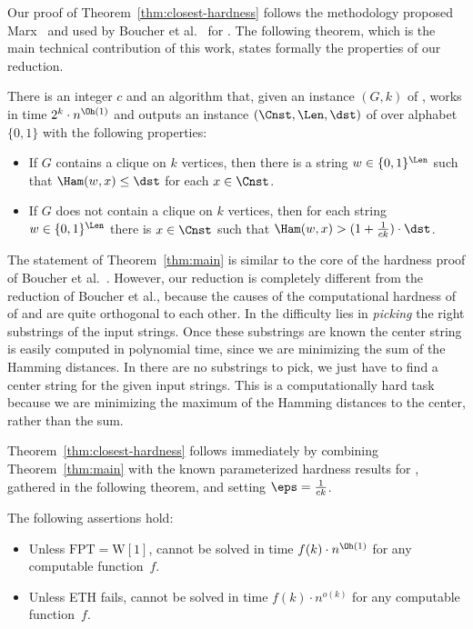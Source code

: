 Our proof of Theorem~\ref{thm:closest-hardness} follows the methodology proposed Marx~\cite{Marx08-survey} and used by Boucher et al.~\cite{Boucher15} for \cPattern. 
The following theorem, which is the main technical contribution of this work, states formally the properties of our reduction.

\begin{theorem}\label{thm:main}
There is an integer $c$ and an algorithm that, given an instance $(G,k)$ of \clique, works in time $2^k\cdot n^{\Oh(1)}$ and outputs an instance $(\Cnst,\Len,\dst)$ of \clString over alphabet $\{0,1\}$ with the following properties:
\begin{itemize}
\item If $G$ contains a clique on $k$ vertices, then there is a string $w\in \{0,1\}^\Len$ such that $\Ham(w,x)\leq \dst$ for each $x\in \Cnst$.
\item If $G$ does not contain a clique on $k$ vertices, then for each string $w\in \{0,1\}^\Len$ there is $x\in \Cnst$ such that $\Ham(w,x)>(1+\frac{1}{ck})\cdot \dst$. 
\end{itemize}
\end{theorem}

The statement of Theorem~\ref{thm:main} is similar to the core of the hardness proof of Boucher et al.~\cite{Boucher15}. However, our reduction is completely different from the reduction of Boucher et al., because the causes of the computational hardness of of \clString and \cPattern are quite orthogonal to each other. In \cPattern the difficulty lies in {\em picking} the right substrings of the input strings. Once these substrings are known the center string is easily computed in polynomial time, since we are minimizing the sum of the Hamming distances. In \clString there are no substrings to pick, we just have to find a center string for the given input strings. This is a computationally hard task because we are minimizing the maximum of the Hamming distances to the center, rather than the sum. 






Theorem~\ref{thm:closest-hardness} follows immediately by combining Theorem~\ref{thm:main} with the known parameterized hardness results for \clique, gathered in the following theorem, and setting $\eps=\frac{1}{ck}$.

\begin{theorem}\label{thm:clique-hardness}
The following assertions hold:
\begin{itemize}
\item Unless $\mathrm{FPT}=\mathrm{W}[1]$, \clique cannot be solved in time $f(k)\cdot n^{\Oh(1)}$ for any computable function~$f$.
\item Unless ETH fails, \clique cannot be solved in time $f(k)\cdot n^{o(k)}$ for any computable function~$f$.
\end{itemize}
\end{theorem}

